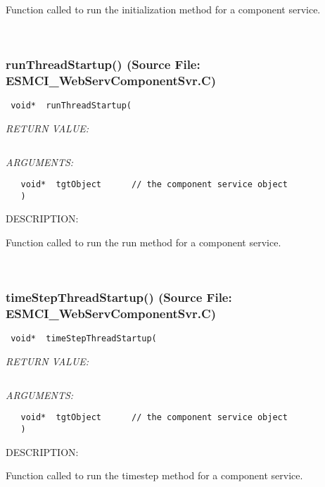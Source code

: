       Function called to run the initialization method for a component service.
   
 
\mbox{}\hrulefill\
 
\subsubsection{runThreadStartup() (Source File: ESMCI\_WebServComponentSvr.C)}


  
\begin{verbatim} void*  runThreadStartup(\end{verbatim}{\em RETURN VALUE:}
\begin{verbatim} \end{verbatim}{\em ARGUMENTS:}
\begin{verbatim}   void*  tgtObject      // the component service object
   )\end{verbatim}
{\sf DESCRIPTION:\\ }


      Function called to run the run method for a component service.
   
 
\mbox{}\hrulefill\
 
\subsubsection{timeStepThreadStartup() (Source File: ESMCI\_WebServComponentSvr.C)}


  
\begin{verbatim} void*  timeStepThreadStartup(\end{verbatim}{\em RETURN VALUE:}
\begin{verbatim} \end{verbatim}{\em ARGUMENTS:}
\begin{verbatim}   void*  tgtObject      // the component service object
   )\end{verbatim}
{\sf DESCRIPTION:\\ }


      Function called to run the timestep method for a component service.
   
 
